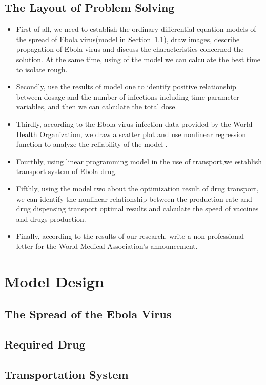 \documentclass{icmmcm}
\begin{document}
\subsection{The Layout of Problem Solving}
\begin{itemize}
  \item First of all, we need to establish the ordinary
  differential equation models of the spread of Ebola
  virus(model in Section~\ref{sec:m1}), draw images, describe
  propagation of Ebola virus and discuss the characteristics
  concerned the solution. At the same time, using of the model
  we can calculate the best time to isolate rough.
  \item Secondly, use the results of model one to identify
  positive relationship between dosage and the number of
  infections including time parameter variables, and then we
  can calculate the total dose.
  \item Thirdly, according to the Ebola virus infection data provided
  by the World Health Organization, we draw a scatter plot and
  use nonlinear regression function to analyze the reliability
  of the model \cite{bib6}.
  \item Fourthly, using linear programming model in the use of
  transport,we establish transport system of Ebola drug.
  \item Fifthly, using the model two about the optimization result of
  drug transport, we can identify the nonlinear relationship
  between the production rate and drug dispensing transport
  optimal results and calculate the speed of vaccines and drugs
  production.
  \item Finally, according to the results of our research,
  write a non-professional letter for the World Medical
  Association's announcement.
\end{itemize}

\section{Model Design}
\subsection{The Spread of the Ebola Virus}
\label{sec:m1}

\subsection{Required Drug}

\subsection{Transportation System}

\end{document}
